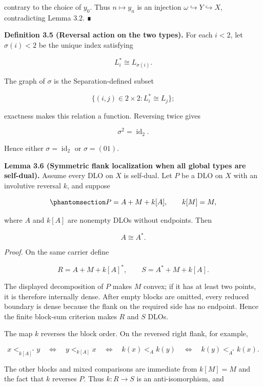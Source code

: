\documentclass[
  english,
  11pt,
  reqno]{amsart}
\newcounter{none} %
\begin{document}
contrary to the choice of \(y_0\). Thus \(n\mapsto y_n\) is an injection
\(\omega\hookrightarrow Y\hookrightarrow X\), contradicting Lemma 3.2. ∎

\protect{}\label{def:3-5-reversal-action}

\textbf{Definition 3.5 (Reversal action on the two types).} For each
\(i<2\), let \(\sigma(i)<2\) be the unique index satisfying

\[
L_i^*\cong L_{\sigma(i)}.
\]

The graph of \(\sigma\) is the Separation-defined subset

\[
\{(i,j)\in2\times2:L_i^*\cong L_j\};
\]

exactness makes this relation a function. Reversing twice gives

\[
\sigma^2=\operatorname{id}_{2}.
\]

Hence either \(\sigma=\operatorname{id}_{2}\) or \(\sigma=(01)\).

\protect{}\label{lem:3-6-all-selfdual-flank}

\textbf{Lemma 3.6 (Symmetric flank localization when all global types
are self-dual).} Assume every DLO on \(X\) is self-dual. Let \(P\) be a
DLO on \(X\) with an involutive reversal \(k\), and suppose

\begin{equation}\protect\phantomsection\label{eq:all-selfdual-flank}{
P=A+M+k[A],
\qquad
k[M]=M,
}\end{equation}

where \(A\) and \(k[A]\) are nonempty DLOs without endpoints. Then

\[
A\cong A^*.
\]

\emph{Proof.} On the same carrier define

\[
R=A+M+k[A]^*,
\qquad
S=A^*+M+k[A].
\]

The displayed decomposition of \(P\) makes \(M\) convex; if it has at
least two points, it is therefore internally dense. After empty blocks
are omitted, every reduced boundary is dense because the flank on the
required side has no endpoint. Hence the finite block-sum criterion
makes \(R\) and \(S\) DLOs.

The map \(k\) reverses the block order. On the reversed right flank, for
example,

\[
x<_{k[A]^*}y
\quad\Longleftrightarrow\quad
y<_{k[A]}x
\quad\Longleftrightarrow\quad
k(x)<_A k(y)
\quad\Longleftrightarrow\quad
k(y)<_{A^*}k(x).
\]

The other blocks and mixed comparisons are immediate from \(k[M]=M\) and
the fact that \(k\) reverses \(P\). Thus \(k:R\to S\) is an
anti-isomorphism, and
\end{document}
